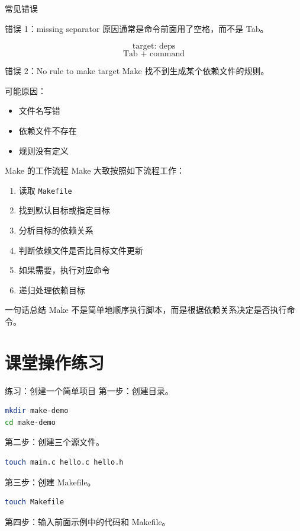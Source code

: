 \documentclass[aspectratio=169]{ctexbeamer}
\begin{document}
\begin{frame}{常见错误}
\begin{block}{错误 1：missing separator}
原因通常是命令前面用了空格，而不是 Tab。

\[
\text{target: deps}
\]
\[
\text{Tab + command}
\]
\end{block}

\begin{block}{错误 2：No rule to make target}
Make 找不到生成某个依赖文件的规则。

可能原因：

\begin{itemize}
  \item 文件名写错
  \item 依赖文件不存在
  \item 规则没有定义
\end{itemize}
\end{block}
\end{frame}

\begin{frame}{Make 的工作流程}
Make 大致按照如下流程工作：

\begin{enumerate}
  \item 读取 \texttt{Makefile}
  \item 找到默认目标或指定目标
  \item 分析目标的依赖关系
  \item 判断依赖文件是否比目标文件更新
  \item 如果需要，执行对应命令
  \item 递归处理依赖目标
\end{enumerate}

\begin{block}{一句话总结}
Make 不是简单地顺序执行脚本，而是根据依赖关系决定是否执行命令。
\end{block}
\end{frame}

\section{课堂操作练习}

\begin{frame}[fragile]{练习：创建一个简单项目}
第一步：创建目录。

\begin{lstlisting}[language=bash]
mkdir make-demo
cd make-demo
\end{lstlisting}

第二步：创建三个源文件。

\begin{lstlisting}[language=bash]
touch main.c hello.c hello.h
\end{lstlisting}

第三步：创建 Makefile。

\begin{lstlisting}[language=bash]
touch Makefile
\end{lstlisting}

第四步：输入前面示例中的代码和 Makefile。
\end{frame}
\end{document}
